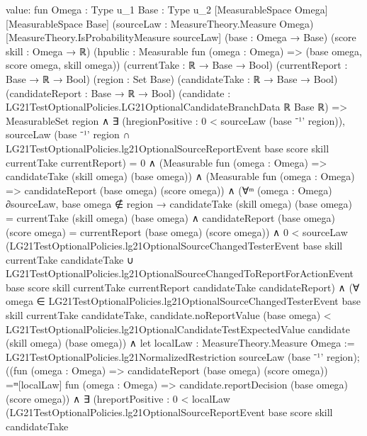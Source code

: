 \documentclass[10pt]{article}
\begin{document}
\begin{ReviewVerbatim}
value:
fun {Omega : Type u_1} {Base : Type u_2} [MeasurableSpace Omega] [MeasurableSpace Base]
    (sourceLaw : MeasureTheory.Measure Omega) [MeasureTheory.IsProbabilityMeasure sourceLaw] (base : Omega → Base)
    (score skill : Omega → ℝ) (hpublic : Measurable fun (omega : Omega) => (base omega, score omega, skill omega))
    (currentTake : ℝ → Base → Bool) (currentReport : Base → ℝ → Bool) (region : Set Base)
    (candidateTake : ℝ → Base → Bool) (candidateReport : Base → ℝ → Bool)
    (candidate : LG21TestOptionalPolicies.LG21OptionalCandidateBranchData ℝ Base ℝ) =>
  MeasurableSet region ∧
    ∃ (hregionPositive : 0 < sourceLaw (base ⁻¹' region)),
      sourceLaw
            (base ⁻¹' region ∩
              LG21TestOptionalPolicies.lg21OptionalSourceReportEvent base score skill currentTake currentReport) =
          0 ∧
        (Measurable fun (omega : Omega) => candidateTake (skill omega) (base omega)) ∧
          (Measurable fun (omega : Omega) => candidateReport (base omega) (score omega)) ∧
            (∀ᵐ (omega : Omega) ∂sourceLaw,
                base omega ∉ region →
                  candidateTake (skill omega) (base omega) = currentTake (skill omega) (base omega) ∧
                    candidateReport (base omega) (score omega) = currentReport (base omega) (score omega)) ∧
              0 <
                  sourceLaw
                    (LG21TestOptionalPolicies.lg21OptionalSourceChangedTesterEvent base skill currentTake
                        candidateTake ∪
                      LG21TestOptionalPolicies.lg21OptionalSourceChangedToReportForActionEvent base score skill
                        currentTake currentReport candidateTake candidateReport) ∧
                (∀
                    omega ∈
                      LG21TestOptionalPolicies.lg21OptionalSourceChangedTesterEvent base skill currentTake
                        candidateTake,
                    candidate.noReportValue (base omega) <
                      LG21TestOptionalPolicies.lg21OptionalCandidateTestExpectedValue candidate (skill omega)
                        (base omega)) ∧
                  let localLaw : MeasureTheory.Measure Omega :=
                    LG21TestOptionalPolicies.lg21NormalizedRestriction sourceLaw (base ⁻¹' region);
                  ((fun (omega : Omega) => candidateReport (base omega) (score omega)) =ᵐ[localLaw]
                      fun (omega : Omega) => candidate.reportDecision (base omega) (score omega)) ∧
                    ∃ (hreportPositive :
                      0 <
                        localLaw
                          (LG21TestOptionalPolicies.lg21OptionalSourceReportEvent base score skill candidateTake

\end{ReviewVerbatim}
\end{document}
